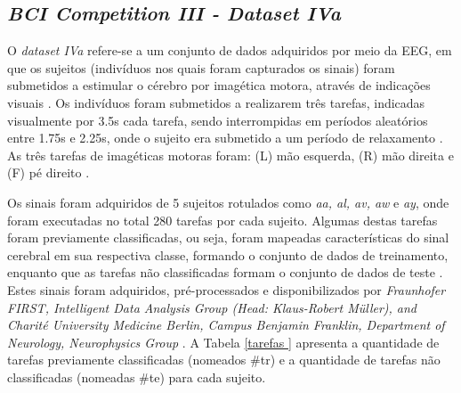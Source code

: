 \subsection{\textit{BCI Competition III - Dataset IVa}}
O \textit{dataset IVa} refere-se a um conjunto de dados adquiridos por meio da EEG, em que os sujeitos (indivíduos nos quais foram capturados os sinais) foram submetidos a estimular o cérebro por imagética motora, através de indicações visuais \cite{BCICompetition}. Os indivíduos foram submetidos a realizarem três tarefas, indicadas visualmente por 3.5s cada tarefa, sendo interrompidas em períodos aleatórios entre 1.75s e 2.25s, onde o sujeito era submetido a um período de relaxamento \cite{BCICompetition}. As três tarefas de imagéticas motoras foram: (L) mão esquerda, (R) mão direita e (F) pé direito \cite{BCICompetition}.

Os sinais foram adquiridos de 5 sujeitos rotulados como \textit{aa, al, av, aw} e \textit{ay}, onde foram executadas no total 280 tarefas por cada sujeito. Algumas destas tarefas foram previamente classificadas, ou seja, foram mapeadas características do sinal cerebral em sua respectiva classe, formando o conjunto de dados de treinamento, enquanto que as tarefas não classificadas formam o conjunto de dados de teste \cite{siteBCI}. Estes sinais foram adquiridos, pré-processados e disponibilizados por \textit{Fraunhofer FIRST, Intelligent Data Analysis Group (Head: Klaus-Robert Müller), and Charité University Medicine Berlin, Campus Benjamin Franklin, Department of Neurology, Neurophysics Group} \cite{BCICompetition}. A Tabela \ref{tarefas
} apresenta a quantidade de tarefas previamente classificadas (nomeados \#tr) e a quantidade de tarefas não classificadas (nomeadas \#te) para cada sujeito.

